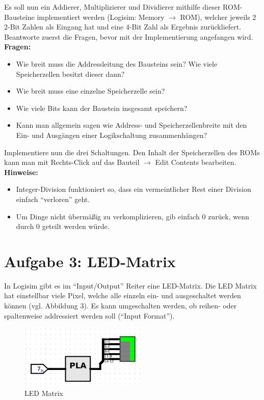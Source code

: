 \documentclass[a4paper]{scrartcl}
\begin{document}
Es soll nun ein Addierer, Multiplizierer und Dividierer mithilfe dieser ROM-Bausteine implementiert werden (Logisim: Memory $\rightarrow$ ROM), welcher
jeweils 2 2-Bit Zahlen als Eingang hat und eine 4-Bit Zahl als Ergebnis zurückliefert. Beantworte zuerst die Fragen, bevor mit der 
Implementierung angefangen wird.\\

\textbf{Fragen:}
\begin{itemize}
  \item Wie breit muss die Addressleitung des Bausteins sein? Wie viele Speicherzellen besitzt dieser dann?
  \item Wie breit muss eine einzelne Speicherzelle sein?
  \item Wie viele Bits kann der Baustein insgesamt speichern?
  \item Kann man allgemein sagen wie Address- und Speicherzellenbreite mit den Ein- und Ausgängen einer Logikschaltung zusammenhängen?
\end{itemize}

Implementiere nun die drei Schaltungen. Den Inhalt der Speicherzellen
des ROMs kann man mit Rechts-Click auf das Bauteil $\rightarrow$ Edit Contents bearbeiten.\\

\textbf{Hinweise:}
\begin{itemize}
  \item Integer-Division funktioniert so, dass ein vermeintlicher Rest einer Division einfach ``verloren'' geht.
  \item Um Dinge nicht übermäßig zu verkomplizieren, gib einfach 0 zurück, wenn durch 0 geteilt werden würde.
\end{itemize}

\section*{Aufgabe 3: LED-Matrix}
In Logisim gibt es im ``Input/Output'' Reiter eine LED-Matrix. Die LED Matrix hat einstellbar viele Pixel, welche alle einzeln ein- und ausgeschaltet werden können (vgl. Abbildung 3).
Es kann umgeschalten werden, ob reihen- oder spaltenweise addressiert werden soll (``Input Format'').
\begin{figure}[h]
  \centering
  \includegraphics[width=6cm]{LEDMatrix.png}
\caption{LED Matrix}
\end{figure}
\end{document}
